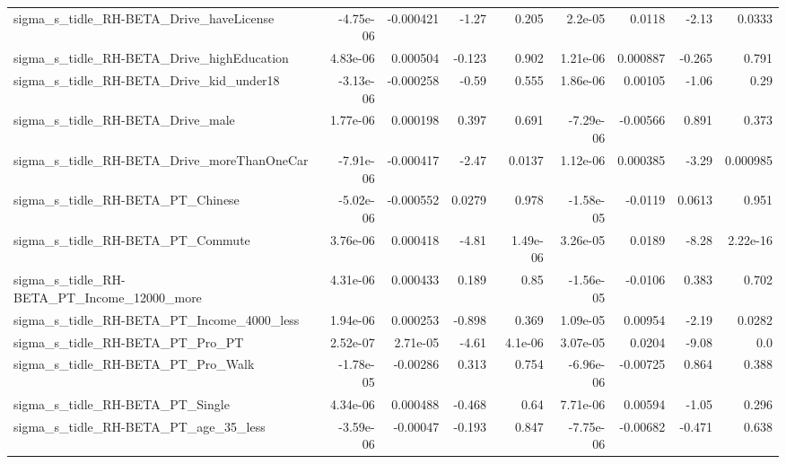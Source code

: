 \begin{tabular}{lrrrrrrrr}
sigma\_s\_tidle\_RH-BETA\_Drive\_haveLicense            &   -4.75e-06 &    -0.000421 &     -1.27 &    0.205 &    2.2e-05 &      0.0118 &        -2.13 &        0.0333 \\
sigma\_s\_tidle\_RH-BETA\_Drive\_highEducation          &    4.83e-06 &     0.000504 &    -0.123 &    0.902 &   1.21e-06 &    0.000887 &       -0.265 &         0.791 \\
sigma\_s\_tidle\_RH-BETA\_Drive\_kid\_under18            &   -3.13e-06 &    -0.000258 &     -0.59 &    0.555 &   1.86e-06 &     0.00105 &        -1.06 &          0.29 \\
sigma\_s\_tidle\_RH-BETA\_Drive\_male                   &    1.77e-06 &     0.000198 &     0.397 &    0.691 &  -7.29e-06 &    -0.00566 &        0.891 &         0.373 \\
sigma\_s\_tidle\_RH-BETA\_Drive\_moreThanOneCar         &   -7.91e-06 &    -0.000417 &     -2.47 &   0.0137 &   1.12e-06 &    0.000385 &        -3.29 &      0.000985 \\
sigma\_s\_tidle\_RH-BETA\_PT\_Chinese                   &   -5.02e-06 &    -0.000552 &    0.0279 &    0.978 &  -1.58e-05 &     -0.0119 &       0.0613 &         0.951 \\
sigma\_s\_tidle\_RH-BETA\_PT\_Commute                   &    3.76e-06 &     0.000418 &     -4.81 & 1.49e-06 &   3.26e-05 &      0.0189 &        -8.28 &      2.22e-16 \\
sigma\_s\_tidle\_RH-BETA\_PT\_Income\_12000\_more         &    4.31e-06 &     0.000433 &     0.189 &     0.85 &  -1.56e-05 &     -0.0106 &        0.383 &         0.702 \\
sigma\_s\_tidle\_RH-BETA\_PT\_Income\_4000\_less          &    1.94e-06 &     0.000253 &    -0.898 &    0.369 &   1.09e-05 &     0.00954 &        -2.19 &        0.0282 \\
sigma\_s\_tidle\_RH-BETA\_PT\_Pro\_PT                    &    2.52e-07 &     2.71e-05 &     -4.61 &  4.1e-06 &   3.07e-05 &      0.0204 &        -9.08 &           0.0 \\
sigma\_s\_tidle\_RH-BETA\_PT\_Pro\_Walk                  &   -1.78e-05 &     -0.00286 &     0.313 &    0.754 &  -6.96e-06 &    -0.00725 &        0.864 &         0.388 \\
sigma\_s\_tidle\_RH-BETA\_PT\_Single                    &    4.34e-06 &     0.000488 &    -0.468 &     0.64 &   7.71e-06 &     0.00594 &        -1.05 &         0.296 \\
sigma\_s\_tidle\_RH-BETA\_PT\_age\_35\_less               &   -3.59e-06 &     -0.00047 &    -0.193 &    0.847 &  -7.75e-06 &    -0.00682 &       -0.471 &         0.638 \\

\end{tabular}

